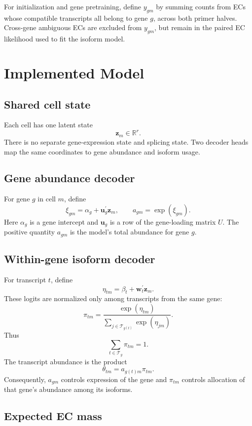 \documentclass[11pt]{article}
\begin{document}
For initialization and gene pretraining, define \(y_{gm}\) by summing counts
from ECs whose compatible transcripts all belong to gene \(g\), across both
primer halves. Cross-gene ambiguous ECs are excluded from \(y_{gm}\), but
remain in the paired EC likelihood used to fit the isoform model.

\section*{Implemented Model}

\subsection*{Shared cell state}

Each cell has one latent state
\[
  \bm z_m\in\mathbb R^r.
\]
There is no separate gene-expression state and splicing state. Two decoder
heads map the same coordinates to gene abundance and isoform usage.

\subsection*{Gene abundance decoder}

For gene \(g\) in cell \(m\), define
\[
  \xi_{gm}=\alpha_g+\bm u_g^\prime\bm z_m,
  \qquad
  a_{gm}=\exp(\xi_{gm}).
\]
Here \(\alpha_g\) is a gene intercept and \(\bm u_g\) is a row of the
gene-loading matrix \(U\). The positive quantity \(a_{gm}\) is the model's
total abundance for gene \(g\).

\subsection*{Within-gene isoform decoder}

For transcript \(t\), define
\[
  \eta_{tm}=\beta_t+\bm w_t^\prime\bm z_m.
\]
These logits are normalized only among transcripts from the same gene:
\[
  \pi_{tm}
  =
  \frac{\exp(\eta_{tm})}
       {\sum_{j\in\mathcal T_{g(t)}}\exp(\eta_{jm})}.
\]
Thus
\[
  \sum_{t\in\mathcal T_g}\pi_{tm}=1.
\]
The transcript abundance is the product
\[
  \theta_{tm}=a_{g(t)m}\pi_{tm}.
\]
Consequently, \(a_{gm}\) controls expression of the gene and \(\pi_{tm}\)
controls allocation of that gene's abundance among its isoforms.

\subsection*{Expected EC mass}
\end{document}
